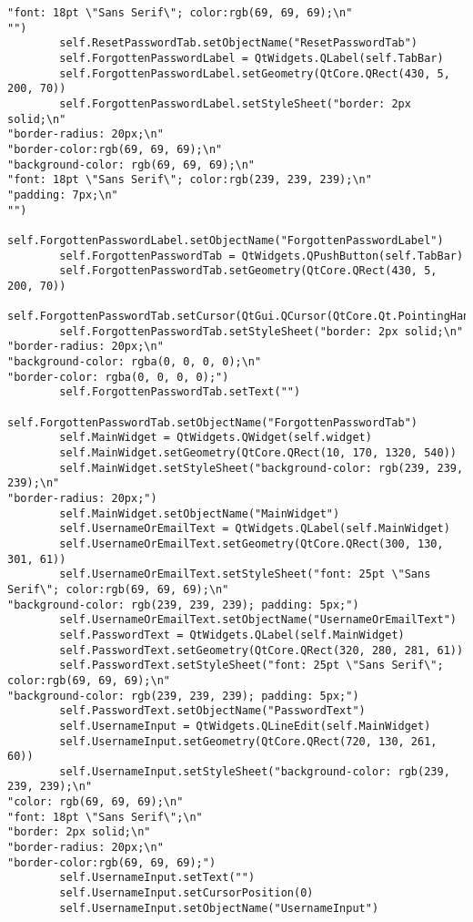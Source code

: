\documentclass{article}
\begin{document}
\begin{lstlisting}
"font: 18pt \"Sans Serif\"; color:rgb(69, 69, 69);\n"
"")
        self.ResetPasswordTab.setObjectName("ResetPasswordTab")
        self.ForgottenPasswordLabel = QtWidgets.QLabel(self.TabBar)
        self.ForgottenPasswordLabel.setGeometry(QtCore.QRect(430, 5, 200, 70))
        self.ForgottenPasswordLabel.setStyleSheet("border: 2px solid;\n"
"border-radius: 20px;\n"
"border-color:rgb(69, 69, 69);\n"
"background-color: rgb(69, 69, 69);\n"
"font: 18pt \"Sans Serif\"; color:rgb(239, 239, 239);\n"
"padding: 7px;\n"
"")
        self.ForgottenPasswordLabel.setObjectName("ForgottenPasswordLabel")
        self.ForgottenPasswordTab = QtWidgets.QPushButton(self.TabBar)
        self.ForgottenPasswordTab.setGeometry(QtCore.QRect(430, 5, 200, 70))
        self.ForgottenPasswordTab.setCursor(QtGui.QCursor(QtCore.Qt.PointingHandCursor))
        self.ForgottenPasswordTab.setStyleSheet("border: 2px solid;\n"
"border-radius: 20px;\n"
"background-color: rgba(0, 0, 0, 0);\n"
"border-color: rgba(0, 0, 0, 0);")
        self.ForgottenPasswordTab.setText("")
        self.ForgottenPasswordTab.setObjectName("ForgottenPasswordTab")
        self.MainWidget = QtWidgets.QWidget(self.widget)
        self.MainWidget.setGeometry(QtCore.QRect(10, 170, 1320, 540))
        self.MainWidget.setStyleSheet("background-color: rgb(239, 239, 239);\n"
"border-radius: 20px;")
        self.MainWidget.setObjectName("MainWidget")
        self.UsernameOrEmailText = QtWidgets.QLabel(self.MainWidget)
        self.UsernameOrEmailText.setGeometry(QtCore.QRect(300, 130, 301, 61))
        self.UsernameOrEmailText.setStyleSheet("font: 25pt \"Sans Serif\"; color:rgb(69, 69, 69);\n"
"background-color: rgb(239, 239, 239); padding: 5px;")
        self.UsernameOrEmailText.setObjectName("UsernameOrEmailText")
        self.PasswordText = QtWidgets.QLabel(self.MainWidget)
        self.PasswordText.setGeometry(QtCore.QRect(320, 280, 281, 61))
        self.PasswordText.setStyleSheet("font: 25pt \"Sans Serif\"; color:rgb(69, 69, 69);\n"
"background-color: rgb(239, 239, 239); padding: 5px;")
        self.PasswordText.setObjectName("PasswordText")
        self.UsernameInput = QtWidgets.QLineEdit(self.MainWidget)
        self.UsernameInput.setGeometry(QtCore.QRect(720, 130, 261, 60))
        self.UsernameInput.setStyleSheet("background-color: rgb(239, 239, 239);\n"
"color: rgb(69, 69, 69);\n"
"font: 18pt \"Sans Serif\";\n"
"border: 2px solid;\n"
"border-radius: 20px;\n"
"border-color:rgb(69, 69, 69);")
        self.UsernameInput.setText("")
        self.UsernameInput.setCursorPosition(0)
        self.UsernameInput.setObjectName("UsernameInput")

\end{lstlisting}
\end{document}
